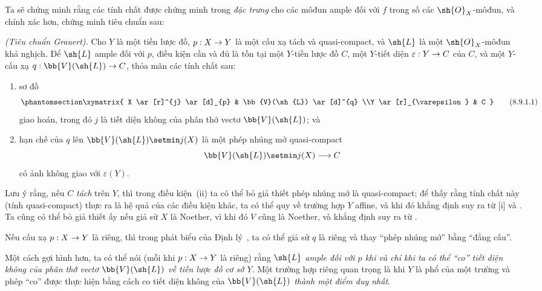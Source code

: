 \documentclass[oneside,10pt]{amsart}
\makeatletter
\newcommand{\ega@arrow}[2]{\mathchoice{#1}{#2}{#2}{#2}}
\renewcommand{\to}{\ega@arrow{\longrightarrow}{\rightarrow}}
\newcommand{\oldpage}[2][]{\marginnote{\normalfont\footnotesize\textbf{#1}~|~#2}\ignorespaces}
\let\EGAOriginalLabel\label
\renewcommand{\label}[1]{\phantomsection\EGAOriginalLabel{#1}}
\makeatother
\begin{document}
Ta sẽ chứng minh rằng các tính chất được chứng minh trong  \emph{đặc trưng} cho các môđun ample đối với $f$ trong số các $\sh{O}_X$-môđun, và chính xác hơn, chứng minh tiêu chuẩn sau:
\begin{theorem}[8.9.1]
\label{II.8.9.1}
\emph{(Tiêu chuẩn Grauert).}
Cho $Y$ là một tiền lược đồ, $p:X\to Y$ là một cấu xạ tách và quasi-compact, và $\sh{L}$ là một $\sh{O}_X$-môđun khả nghịch.
Để $\sh{L}$ ample đối với $p$, điều kiện cần và đủ là tồn tại một $Y$-tiền lược đồ $C$, một $Y$-tiết diện $\varepsilon:Y\to C$ của $C$, và một $Y$-cấu xạ $q:\bb{V}(\sh{L})\to C$, thỏa mãn các tính chất sau:
\begin{enumerate}
  \item[\rm{(i)}] sơ đồ
    \[
      \label{II.8.9.1.1}
        \xymatrix{
          X
            \ar[r]^{j}
            \ar[d]_{p}
        & \bb{V}(\sh{L})
            \ar[d]^{q}
        \\Y
            \ar[r]_{\varepsilon}
        & C
        }
      \tag{8.9.1.1}
    \]
    giao hoán, trong đó $j$ là tiết diện không của phân thớ vectơ $\bb{V}(\sh{L})$; và
  \item[\rm{(ii)}] hạn chế của $q$ lên $\bb{V}(\sh{L})\setmin j(X)$ là một phép nhúng mở quasi-compact
    \[
      \bb{V}(\sh{L})\setmin j(X)\to C
    \]
    có ảnh không giao với $\varepsilon(Y)$.
\end{enumerate}
\end{theorem}

Lưu ý rằng, nếu $C$ \emph{tách} trên $Y$, thì trong điều kiện~(ii) ta có thể bỏ giả thiết phép nhúng mở là quasi-compact;
để thấy rằng tính chất này (tính quasi-compact) thực ra là hệ quả của các điều kiện khác, ta có thể quy về trường hợp $Y$ affine, và khi đó khẳng định suy ra từ [i] và .
Ta cũng có thể bỏ
\oldpage[II]{183}
giả thiết ấy nếu giả sử $X$ là Noether, vì khi đó $V$ cũng là Noether, và khẳng định suy ra từ .

\begin{corollary}[8.9.2]
\label{II.8.9.2}
Nếu cấu xạ $p:X\to Y$ là riêng, thì trong phát biểu của Định lý~, ta có thể giả sử $q$ là riêng và thay “phép nhúng mở” bằng “đẳng cấu”.
\end{corollary}

Một cách gợi hình hơn, ta có thể nói (mỗi khi $p:X\to Y$ là riêng) rằng \emph{$\sh{L}$ ample đối với $p$ khi và chỉ khi ta có thể “\emph{co}” tiết diện không của phân thớ vectơ $\bb{V}(\sh{L})$ về tiền lược đồ cơ sở $Y$.}
Một trường hợp riêng quan trọng là khi $Y$ là phổ của một trường và phép “co” được thực hiện bằng cách co tiết diện không của $\bb{V}(\sh{L})$ \emph{thành một điểm duy nhất}.
\end{document}
